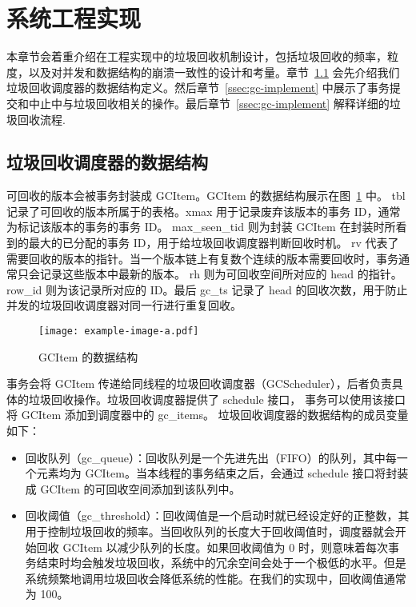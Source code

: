 \section{系统工程实现}
\label{sec:implement}

本章节会着重介绍在工程实现中的垃圾回收机制设计，包括垃圾回收的频率，粒度，以及对并发和数据结构的崩溃一致性的设计和考量。章节~\ref{ssec:gc-metadata} 会先介绍我们垃圾回收调度器的数据结构定义。然后章节~\ref{ssec:gc-implement} 中展示了事务提交和中止中与垃圾回收相关的操作。最后章节~\ref{ssec:gc-implement} 解释详细的垃圾回收流程.

\subsection{垃圾回收调度器的数据结构}
\label{ssec:gc-metadata}


可回收的版本会被事务封装成 GCItem。GCItem 的数据结构展示在图~\ref{fig:gc-item} 中。
tbl 记录了可回收的版本所属于的表格。xmax 用于记录废弃该版本的事务 ID，通常为标记该版本的事务的事务 ID。
max\_seen\_tid 则为封装 GCItem 在封装时所看到的最大的已分配的事务 ID，用于给垃圾回收调度器判断回收时机。
rv 代表了需要回收的版本的指针。当一个版本链上有复数个连续的版本需要回收时，事务通常只会记录这些版本中最新的版本。
rh 则为可回收空间所对应的 head 的指针。row\_id 则为该记录所对应的 ID。最后 gc\_ts 记录了 head 的回收次数，用于防止并发的垃圾回收调度器对同一行进行重复回收。

\begin{figure}
    \centering
    \texttt{[image: example-image-a.pdf]}
    \caption{GCItem 的数据结构}
    \label{fig:gc-item}
\end{figure}


事务会将 GCItem 传递给同线程的垃圾回收调度器（GCScheduler），后者负责具体的垃圾回收操作。垃圾回收调度器提供了 schedule 接口，
事务可以使用该接口将 GCItem 添加到调度器中的 gc\_items。
垃圾回收调度器的数据结构的成员变量如下：
\begin{itemize}
    \item 回收队列（gc\_queue）：回收队列是一个先进先出（FIFO）的队列，其中每一个元素均为 GCItem。当本线程的事务结束之后，会通过 schedule 接口将封装成 GCItem 的可回收空间添加到该队列中。
    \item 回收阈值（gc\_threshold）：回收阈值是一个启动时就已经设定好的正整数，其用于控制垃圾回收的频率。当回收队列的长度大于回收阈值时，调度器就会开始回收 GCItem 以减少队列的长度。如果回收阈值为 0 时，则意味着每次事务结束时均会触发垃圾回收，系统中的冗余空间会处于一个极低的水平。但是系统频繁地调用垃圾回收会降低系统的性能。在我们的实现中，回收阈值通常为 100。
\end{itemize}



